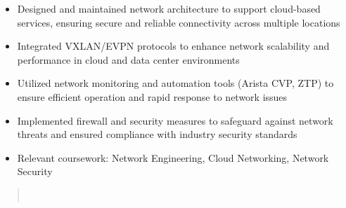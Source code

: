 \par\smallskip
\begin{minipage}{13.75cm}
  \begin{minipage}{6.5cm}
    \begin{itemize}
      \item Designed and maintained network architecture to support cloud-based services, ensuring secure and reliable connectivity across multiple locations
      \item Integrated VXLAN/EVPN protocols to enhance network scalability and performance in cloud and data center environments
    \end{itemize}
  \end{minipage}
  \hfill
  \begin{minipage}{6.5cm}
    \begin{itemize}
      \item Utilized network monitoring and automation tools (Arista CVP, ZTP) to ensure efficient operation and rapid response to network issues
      \item Implemented firewall and security measures to safeguard against network threats and ensured compliance with industry security standards
    \end{itemize}
  \end{minipage}
\end{minipage}

\par\bigskip
{}
\begin{itemize}
  \item Relevant coursework: Network Engineering, Cloud Networking, Network Security
\end{itemize}
\divider

\begin{quote}
  \hfill{}\\
  \hfill{}
\end{quote}


